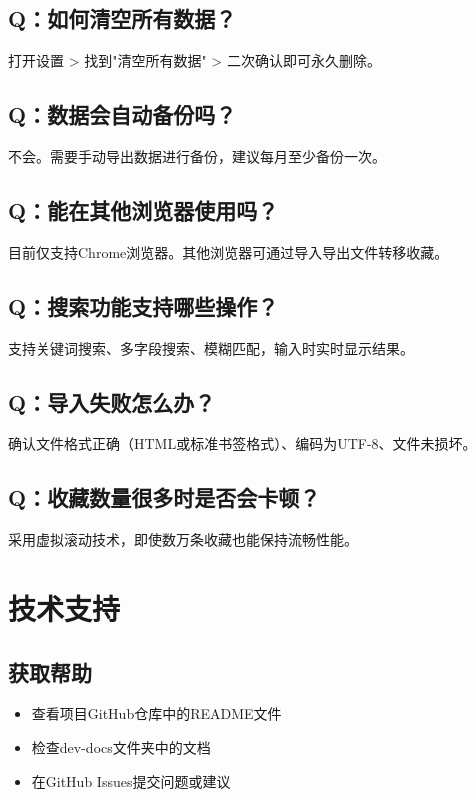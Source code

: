 \documentclass[10pt,a4paper]{article}
\begin{document}
\subsection{Q：如何清空所有数据？}
打开设置 > 找到"清空所有数据" > 二次确认即可永久删除。

\subsection{Q：数据会自动备份吗？}
不会。需要手动导出数据进行备份，建议每月至少备份一次。

\subsection{Q：能在其他浏览器使用吗？}
目前仅支持Chrome浏览器。其他浏览器可通过导入导出文件转移收藏。

\subsection{Q：搜索功能支持哪些操作？}
支持关键词搜索、多字段搜索、模糊匹配，输入时实时显示结果。

\subsection{Q：导入失败怎么办？}
确认文件格式正确（HTML或标准书签格式）、编码为UTF-8、文件未损坏。

\subsection{Q：收藏数量很多时是否会卡顿？}
采用虚拟滚动技术，即使数万条收藏也能保持流畅性能。

\vspace{5pt}

\section{技术支持}

\subsection{获取帮助}
\begin{itemize}
  \item 查看项目GitHub仓库中的README文件
  \item 检查dev-docs文件夹中的文档
  \item 在GitHub Issues提交问题或建议
\end{itemize}
\end{document}
